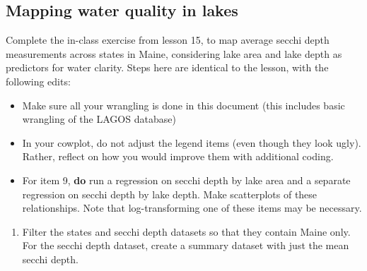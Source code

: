 \documentclass[]{article}
\newenvironment{Shaded}{\begin{snugshade}}{\end{snugshade}}
\newcommand{\CommentTok}[1]{\textcolor[rgb]{0.56,0.35,0.01}{\textit{#1}}}
\newcommand{\KeywordTok}[1]{\textcolor[rgb]{0.13,0.29,0.53}{\textbf{#1}}}
\newcommand{\NormalTok}[1]{#1}
\newcommand{\OperatorTok}[1]{\textcolor[rgb]{0.81,0.36,0.00}{\textbf{#1}}}
\newcommand{\StringTok}[1]{\textcolor[rgb]{0.31,0.60,0.02}{#1}}
\providecommand{\tightlist}{%
  \setlength{\itemsep}{0pt}\setlength{\parskip}{0pt}}
\begin{document}
\hypertarget{mapping-water-quality-in-lakes}{%
\subsection{Mapping water quality in
lakes}\label{mapping-water-quality-in-lakes}}

Complete the in-class exercise from lesson 15, to map average secchi
depth measurements across states in Maine, considering lake area and
lake depth as predictors for water clarity. Steps here are identical to
the lesson, with the following edits:

\begin{itemize}
\tightlist
\item
  Make sure all your wrangling is done in this document (this includes
  basic wrangling of the LAGOS database)
\item
  In your cowplot, do not adjust the legend items (even though they look
  ugly). Rather, reflect on how you would improve them with additional
  coding.
\item
  For item 9, \textbf{do} run a regression on secchi depth by lake area
  and a separate regression on secchi depth by lake depth. Make
  scatterplots of these relationships. Note that log-transforming one of
  these items may be necessary.
\end{itemize}

\begin{enumerate}
\def\labelenumi{\arabic{enumi}.}
\setcounter{enumi}{4}
\tightlist
\item
  Filter the states and secchi depth datasets so that they contain Maine
  only. For the secchi depth dataset, create a summary dataset with just
  the mean secchi depth.
\end{enumerate}

\begin{Shaded}
\end{Shaded}
\end{document}
